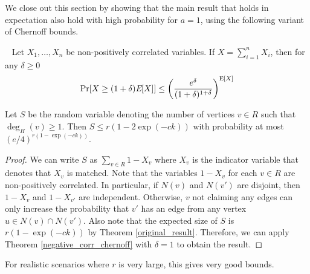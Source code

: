 We close out this section by showing that the main result that holds
in expectation also hold with high probability for $a=1$, using the
following variant of Chernoff bounds.

\begin{thm}\label{negative_corr_chernoff}~\cite{AugerDoerr2011}
Let $X_1,\ldots, X_n$ be non-positively correlated variables. If $X=\sum_{i=1}^n X_i$, then for any $\delta\geq 0$
\[ \Pr[X \geq (1+\delta)\emph{\text{E}}[X] ] \leq \left(\frac{e^\delta}{(1+\delta)^{1+\delta}}\right)^{\text{E}[X]} \]
\end{thm}


\begin{thm}
Let $S$ be the random variable denoting the number of vertices $v \in R$ such that $\deg_{H}(v)\geq 1$. Then
$ S \leq r(1-2\exp(-ck))$ with probability at most $(e/4)^{r(1-\exp(-ck))}$.
\end{thm}

\begin{proof}
We can write $S$ as $\sum_{v\in R} 1-X_v$ where $X_v$ is the indicator
variable that denotes that $X_v$ is matched. Note that the variables
$1-X_v$ for each $v\in R$ are non-positively correlated. In
particular, if $N(v)$ and $N(v')$ are disjoint, then $1-X_v$ and
$1-X_{v'}$ are independent. Otherwise, $v$ not claiming any edges can
only increase the probability that $v'$ has an edge from any vertex
$u\in N(v)\cap N(v')$. Also note that the expected size of $S$ is
$r(1-\exp(-ck))$ by Theorem \ref{original_result}. Therefore, we can
apply Theorem \ref{negative_corr_chernoff} with $\delta=1$ to obtain
the result.
\end{proof}
For realistic scenarios where $r$ is very large, this gives very good bounds. 